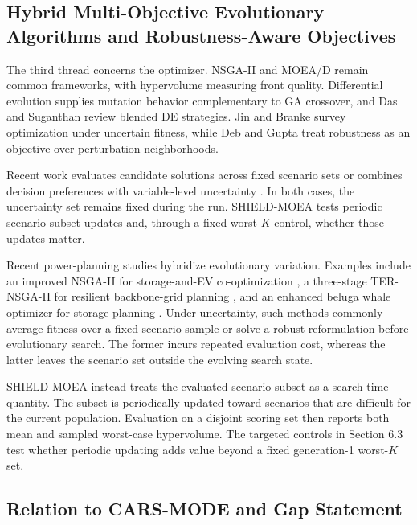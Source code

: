 \documentclass[energies,article,submit,moreauthors]{Definitions/mdpi}
\begin{document}
\subsection{Hybrid Multi-Objective Evolutionary Algorithms and Robustness-Aware Objectives}\label{hybrid-multi-objective-evolutionary-algorithms-and-robustness-aware-objectives}

The third thread concerns the optimizer. NSGA-II \cite{ref30} and MOEA/D \cite{ref31} remain common frameworks, with hypervolume \cite{ref32} measuring front quality. Differential evolution \cite{ref33} supplies mutation behavior complementary to GA crossover, and Das and Suganthan \cite{ref34} review blended DE strategies. Jin and Branke \cite{ref35} survey optimization under uncertain fitness, while Deb and Gupta \cite{ref36} treat robustness as an objective over perturbation neighborhoods.

Recent work evaluates candidate solutions across fixed scenario sets \cite{ref37} or combines decision preferences with variable-level uncertainty \cite{ref38}. In both cases, the uncertainty set remains fixed during the run. SHIELD-MOEA tests periodic scenario-subset updates and, through a fixed worst-\(K\) control, whether those updates matter.

Recent power-planning studies hybridize evolutionary variation. Examples include an improved NSGA-II for storage-and-EV co-optimization \cite{ref39}, a three-stage TER-NSGA-II for resilient backbone-grid planning \cite{ref40}, and an enhanced beluga whale optimizer for storage planning \cite{ref41}. Under uncertainty, such methods commonly average fitness over a fixed scenario sample or solve a robust reformulation before evolutionary search. The former incurs repeated evaluation cost, whereas the latter leaves the scenario set outside the evolving search state.

SHIELD-MOEA instead treats the evaluated scenario subset as a search-time quantity. The subset is periodically updated toward scenarios that are difficult for the current population. Evaluation on a disjoint scoring set then reports both mean and sampled worst-case hypervolume. The targeted controls in Section 6.3 test whether periodic updating adds value beyond a fixed generation-1 worst-\(K\) set.

\subsection{Relation to CARS-MODE and Gap Statement}\label{relation-to-cars-mode-and-gap-statement}
\end{document}
